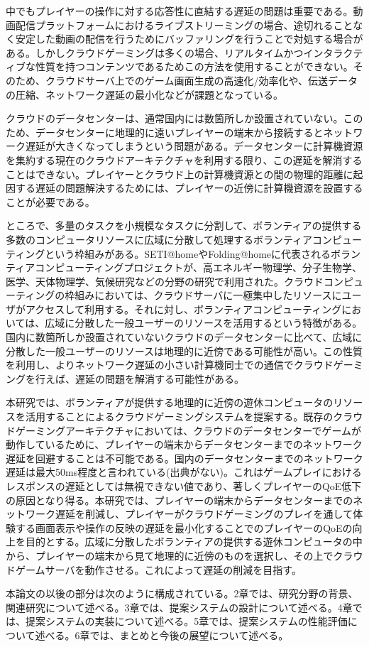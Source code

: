 中でもプレイヤーの操作に対する応答性に直結する遅延の問題は重要である。動画配信プラットフォームにおけるライブストリーミングの場合、途切れることなく安定した動画の配信を行うためにバッファリングを行うことで対処する場合がある。しかしクラウドゲーミングは多くの場合、リアルタイムかつインタラクティブな性質を持つコンテンツであるためこの方法を使用することができない。そのため、クラウドサーバ上でのゲーム画面生成の高速化/効率化や、伝送データの圧縮、ネットワーク遅延の最小化などが課題となっている。

クラウドのデータセンターは、通常国内には数箇所しか設置されていない。このため、データセンターに地理的に遠いプレイヤーの端末から接続するとネットワーク遅延が大きくなってしまうという問題がある。データセンターに計算機資源を集約する現在のクラウドアーキテクチャを利用する限り、この遅延を解消することはできない。プレイヤーとクラウド上の計算機資源との間の物理的距離に起因する遅延の問題解決するためには、プレイヤーの近傍に計算機資源を設置することが必要である。

ところで、多量のタスクを小規模なタスクに分割して、ボランティアの提供する多数のコンピュータリソースに広域に分散して処理するボランティアコンピューティングという枠組みがある。SETI@home\cite{setiathome}やFolding@home\cite{folding}に代表されるボランティアコンピューティングプロジェクトが、高エネルギー物理学、分子生物学、医学、天体物理学、気候研究などの分野の研究で利用された。クラウドコンピューティングの枠組みにおいては、クラウドサーバに一極集中したリソースにユーザがアクセスして利用する。それに対し、ボランティアコンピューティングにおいては、広域に分散した一般ユーザーのリソースを活用するという特徴がある。国内に数箇所しか設置されていないクラウドのデータセンターに比べて、広域に分散した一般ユーザーのリソースは地理的に近傍である可能性が高い。この性質を利用し、よりネットワーク遅延の小さい計算機同士での通信でクラウドゲーミングを行えば、遅延の問題を解消する可能性がある。

本研究では、ボランティアが提供する地理的に近傍の遊休コンピュータのリソースを活用することによるクラウドゲーミングシステムを提案する。既存のクラウドゲーミングアーキテクチャにおいては、クラウドのデータセンターでゲームが動作しているために、プレイヤーの端末からデータセンターまでのネットワーク遅延を回避することは不可能である。国内のデータセンターまでのネットワーク遅延は最大50ms程度と言われている(出典がない)。これはゲームプレイにおけるレスポンスの遅延としては無視できない値であり、著しくプレイヤーのQoE低下の原因となり得る。本研究では、プレイヤーの端末からデータセンターまでのネットワーク遅延を削減し、プレイヤーがクラウドゲーミングのプレイを通して体験する画面表示や操作の反映の遅延を最小化することでのプレイヤーのQoEの向上を目的とする。広域に分散したボランティアの提供する遊休コンピュータの中から、プレイヤーの端末から見て地理的に近傍のものを選択し、その上でクラウドゲームサーバを動作させる。これによって遅延の削減を目指す。

本論文の以後の部分は次のように構成されている。2章では、研究分野の背景、関連研究について述べる。3章では、提案システムの設計について述べる。4章では、提案システムの実装について述べる。5章では、提案システムの性能評価について述べる。6章では、まとめと今後の展望について述べる。







 
